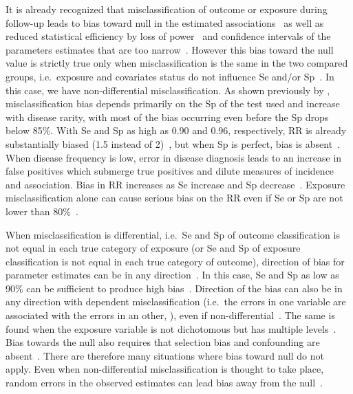 It is already recognized that misclassification of outcome or exposure during
follow-up leads to bias toward null in the estimated
associations~\citep{Bross1954,Copeland1977,FLEGAL_1986} as well as reduced
statistical efficiency by loss of power~\citep{WHITE_1986} and confidence
intervals of the parameters estimates that are too narrow~\citep{Neuhaus_1999}.
However this bias toward the null value is strictly true only when
misclassification is the same in the two compared groups, i.e.\ exposure and
covariates status do not influence Se and/or
Sp~\citep{Copeland1977,Sorahan_1994,Neuhaus_1999}.
In this case, we have non-differential misclassification.
As shown previously by \cite{Copeland1977}, misclassification bias depends
primarily on the Sp of the test used and increase with disease rarity, with most
of the bias occurring even before the Sp drops below 85\%.
With Se and Sp as high as 0.90 and 0.96, respectively, RR is already
substantially biased (1.5 instead of 2)~\citep{Copeland1977}, but when Sp is
perfect, bias is absent~\citep{Poole1985}.
When disease frequency is low, error in disease diagnosis leads to an increase
in false positives which submerge true positives and dilute measures of
incidence and association.
Bias in RR increases as Se increase and Sp decrease~\citep{WHITE_1986}.
Exposure misclassification alone can cause serious bias on the RR even if Se or
Sp are not lower than 80\%~\citep{Kristensen_1992}.

When misclassification is differential, i.e.\ Se and Sp of outcome
classification is not equal in each true category of exposure (or Se and Sp of
exposure classification is not equal in each true category of outcome),
direction of bias for parameter estimates can be in any
direction~\citep{Dosemeci_1990,Neuhaus_1999,Chen_2013}.
In this case, Se and Sp as low as 90\% can be sufficient to produce high
bias~\citep{Kristensen_1992}.
Direction of the bias can also be in any direction with dependent
misclassification (i.e.\ the errors in one variable are associated with the
errors in an other, \citealp{Assakul_1967,Greenland_1989}), even if
non-differential~\citep{Kristensen_1992}.
The same is found when the exposure variable is not dichotomous but has multiple
levels~\citep{Dosemeci_1990,Weinberg_1994}.
Bias towards the null also requires that selection bias and confounding are
absent~\citep{Jurek_2004}.
There are therefore many situations where bias toward null do not apply.
Even when non-differential misclassification is thought to take place, random
errors in the observed estimates can lead bias away from the
null~\citep{Jurek_2004}.

